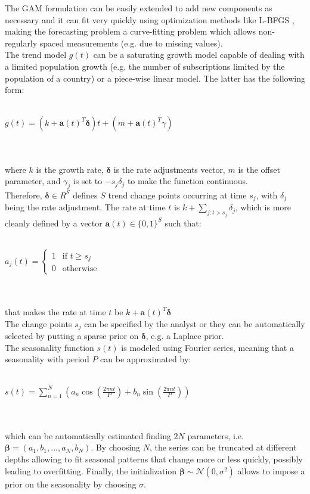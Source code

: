 \documentclass[a4paper, 12pt]{article} %
\begin{document}
	The GAM formulation can be easily extended to add new components as necessary and it can fit very quickly using optimization methods like L-BFGS \cite{L-BFGS}, making the forecasting problem a curve-fitting problem which allows non-regularly spaced measurements (e.g. due to missing values).\\
	The trend model $g(t)$ can be a saturating growth model capable of dealing with a limited population growth (e.g. the number of subscriptions limited by the population of a country) or a piece-wise linear model.
	The latter has the following form:\\\\
	\centerline{
		$g(t) = (k+\pmb{a}(t)^T\pmb{\delta})t + (m + \pmb{a}(t)^T\gamma)$
	}\\\\
	where $k$ is the growth rate, $\pmb{\delta}$ is the rate adjustments vector, $m$ is the offset parameter, and $\gamma_j$ is set to $-s_j\delta_j$ to make the function continuous.\\
	Therefore, $\pmb{\delta} \in \!R^S$ defines $S$ trend change points occurring at time $s_j$, with $\delta_j$ being the rate adjustment. The rate at time $t$ is $k+\sum_{j:t>s_j}\delta_j$, which is more cleanly defined by a vector $\pmb{a}(t) \in \{0,1\}^S$ such that:\\\\
	\centerline{
		$
		a_j(t) =
		\begin{cases}
			1 & \text{if $t \geq s_j$}\\
			0 & \text{otherwise}
		\end{cases}       
		$
	}\\\\
	that makes the rate at time $t$ be $k + \pmb{a}(t)^T\pmb{\delta}$\\
	The change points $s_j$  can be specified by the analyst or they can be automatically selected by putting a sparse prior on $\pmb{\delta}$, e.g. a Laplace prior.\\
	The seasonality function $s(t)$ is modeled using Fourier series, meaning that a seasonality with period $P$ can be approximated by:\\\\
	\centerline{$s(t) = \sum_{n=1}^{N} (a_n \cos{(\frac{2\pi nt}{P})} + b_n \sin{(\frac{2\pi nt}{P})}) $}\\\\
	which can be automatically estimated finding $2N$ parameters, i.e.\\ $ \pmb{\beta} =  (a_1, b_1, ..., a_N, b_N)$. By choosing $N$, the series can be truncated at different depths allowing to fit seasonal patterns that change more or less quickly, possibly leading to overfitting. Finally, the initialization $\pmb{\beta} \sim \mathcal{N}(0, \sigma^2)$ allows to impose a prior on the seasonality by choosing $\sigma$. \\
\end{document}
